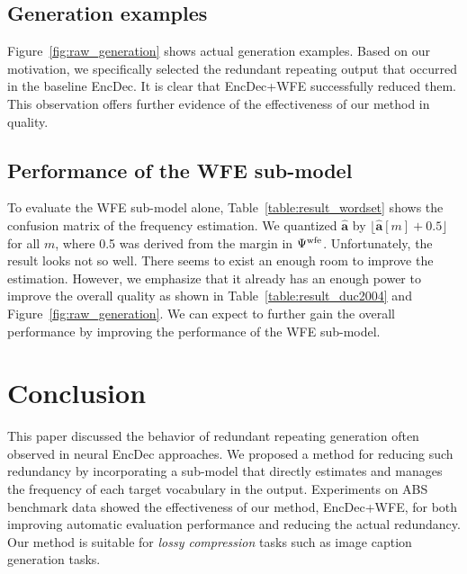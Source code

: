 \documentclass[11pt]{article}
\begin{document}
\subsection{Generation examples}
   Figure~\ref{fig:raw_generation} shows actual generation examples.
   Based on our motivation, we specifically selected the redundant repeating output that occurred in the baseline EncDec.
   It is clear that EncDec+WFE successfully reduced them.
   This observation offers further evidence of the effectiveness of our method in quality.


\subsection{Performance of the WFE sub-model}
   To evaluate the WFE sub-model alone,
   Table~\ref{table:result_wordset} shows the confusion matrix of the frequency estimation.
   We quantized $\hat{\bm{a}}$ by $\lfloor \hat{\bm{a}}[m]+0.5\rfloor$ for all $m$, where 0.5 was derived from the margin in $\Psi^{\rm wfe}$.
   Unfortunately, the result looks not so well.
   There seems to exist an enough room to improve the estimation.
    However, we emphasize that it already has an enough power to improve the overall quality as shown in Table~\ref{table:result_duc2004} and Figure~\ref{fig:raw_generation}.
   We can expect to further gain the overall performance by improving the performance of the WFE sub-model.

\section{Conclusion}
   This paper discussed the behavior of redundant repeating generation often observed in neural EncDec approaches.
   We proposed a method for reducing such redundancy by incorporating a sub-model that directly estimates and manages the frequency of each target vocabulary in the output.
   Experiments on ABS benchmark data showed the effectiveness of our method, EncDec+WFE, for both improving automatic evaluation performance and reducing the actual redundancy.
   Our method is suitable for {\it lossy compression} tasks such as image caption generation tasks.
\end{document}
